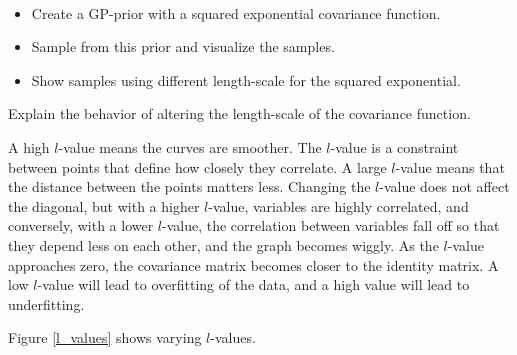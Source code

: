 \documentclass[12pt]{article}
\newenvironment{question}[2][Question]{\begin{trivlist}
\kern10pt
\item[\hskip \labelsep {\bfseries #1}\hskip \labelsep {\bfseries #2.}]}{\end{trivlist}}
\newcommand*{\answer}{%
  \par
  \kern1pt
  \begingroup
    \centering
    \raisebox{.2\baselineskip}{%
      \textcolor{gray}{
	    \rule{.6667\linewidth}{.1pt}%
      }
    }%
    \par
  \kern8pt
  \endgroup
}
\begin{document}
\begin{question}{12}
$ $
\begin{itemize}
\item Create a GP-prior with a squared exponential covariance function.
\item Sample from this prior and visualize the samples.
\item Show samples using different length-scale for the squared exponential.
\end{itemize}

Explain the behavior of altering the length-scale of the covariance function.
\answer

A high $l$-value means the curves are smoother. The $l$-value is a constraint between points that define how closely they correlate. A large $l$-value means that the distance between the points matters less. Changing the $l$-value does not affect the diagonal, but with a higher $l$-value, variables are highly correlated, and conversely, with a lower $l$-value, the correlation between variables fall off so that they depend less on each other, and the graph becomes wiggly. As the $l$-value approaches zero, the covariance matrix becomes closer to the identity matrix. A low $l$-value will lead to overfitting of the data, and a high value will lead to underfitting.

Figure \ref{l_values} shows varying $l$-values.


\end{question}
\end{document}
